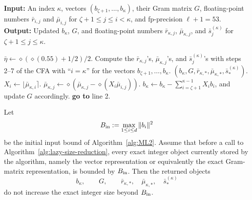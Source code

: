 \begin{algorithm}
\caption{\textsf{LazySizeReduce}$(\kappa,\zeta,(b_1,\dots,b_d),G,\bar r,\bar\mu)$~\cite[Figure~5]{NS09}}
\label{alg:lazy-size-reduction}
\begin{algorithmic}[1]
  \Statex \textbf{Input:} An index $\kappa$, vectors
  $(b_{\zeta+1},\dots,b_\kappa)$, their Gram matrix $G$, floating-point numbers
  $\bar r_{i,j}$ and $\bar\mu_{i,j}$ for $\zeta+1\le j\le i<\kappa$,
  and fp-precision $\ell+1=53$.
  \Statex \textbf{Output:} Updated $b_\kappa$, $G$, and floating-point numbers
  $\bar r_{\kappa,j}$, $\bar\mu_{\kappa,j}$, and
  $\bar s^{(\kappa)}_j$ for $\zeta+1\le j\le \kappa$.

  \State $\bar\eta \gets \diamond(\diamond(0.55)+1/2)/2$.
  \State Compute the $\bar r_{\kappa,j}$'s, $\bar\mu_{\kappa,j}$'s, and
  $\bar s^{(\kappa)}_j$'s with steps 2--7 of the CFA with ``$i=\kappa$''
  for the vectors $b_{\zeta+1},\dots,b_\kappa$.
    \State \Return $(b_\kappa,G,\bar r_{\kappa,*},\bar\mu_{\kappa,*},\bar s^{(\kappa)}_*)$.
  \Else
      \State $X_i \gets \lfloor \bar\mu_{\kappa,i}\rceil$.
        \State $\bar\mu_{\kappa,j}\gets
        \diamond\!\left(\bar\mu_{\kappa,j}
        -\diamond(X_i\bar\mu_{i,j})\right)$.
      \EndFor
    \EndFor
    \State $b_\kappa \gets b_\kappa-\sum_{i=\zeta+1}^{\kappa-1}X_i b_i$,
    and update $G$ accordingly.
    \State \textbf{go to} line 2.
  \EndIf
\end{algorithmic}
\end{algorithm}

\begin{lemma}
\label{lem:lazy-size-reduction-bound}
Let
\[
  B_{\rm in}:=\max_{1\le i\le d}\|b_i\|^2
\]
be the initial input bound of Algorithm~\ref{alg:ML2}. Assume that before a
call to Algorithm~\ref{alg:lazy-size-reduction}, every exact integer object
currently stored by the algorithm, namely the vector representation or
equivalently the exact Gram-matrix representation, is bounded by $B_{\rm in}$.
Then the returned objects
\[
  b_\kappa,\qquad G,\qquad
  \bar r_{\kappa,*},\quad \bar\mu_{\kappa,*},\quad
  \bar s^{(\kappa)}_*
\]
do not increase the exact integer size beyond $B_{\rm in}$.
\end{lemma}

